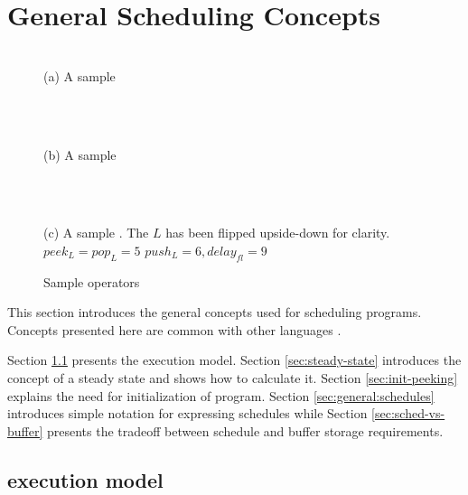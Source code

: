 \section{General {\StreamIt} Scheduling Concepts}
\label{chpt:sched-basic}

\begin{figure}
\begin{center}

\begin{minipage}{1.2in}
\centering {} \\
{\protect\small (a) A sample {\pipeline}}
\end{minipage}
~
\begin{minipage}{1.2in}
\centering {} \\
{\protect\small (b) A sample {\splitjoin}}
\end{minipage}
~
\begin{minipage}{1.5in}
\centering {} \\
{\protect\small (c) A sample {\feedbackloop}.  The $L$ {\filter}
has been flipped upside-down for clarity.\\ $peek_L = pop_L = 5$
$push_L = 6, delay_{fl} = 9$}
\end{minipage}

\caption{Sample {\StreamIt} operators} \label{fig:steady-state}

\end{center}
\end{figure}

This section introduces the general concepts used for scheduling
{\StreamIt} programs.  Concepts presented here are common with
other languages \cite{ptolemyoverview} \cite{esterel92}
\cite{lustre}.

Section \ref{sec:exec-model} presents the {\StreamIt} execution
model. Section \ref{sec:steady-state} introduces the concept of a
steady state and shows how to calculate it. Section
\ref{sec:init-peeking} explains the need for initialization of
{\StreamIt} program. Section \ref{sec:general:schedules} introduces
simple notation for expressing schedules while Section
\ref{sec:sched-vs-buffer} presents the tradeoff between schedule
and buffer storage requirements.

\subsection{{\StreamIt} execution model}
\label{sec:exec-model}


